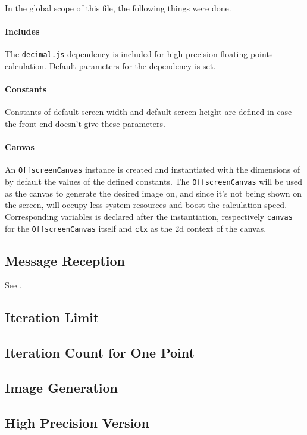 In the global scope of this file, the following things were done.

\paragraph{Includes} The \texttt{decimal.js} dependency is included for high-precision floating points calculation. Default parameters for the dependency is set.

\paragraph{Constants} Constants of default screen width and default screen height are defined in case the front end doesn't give these parameters.

\paragraph{Canvas} An \texttt{OffscreenCanvas} instance is created and instantiated with the dimensions of by default the values of the defined constants. The \texttt{OffscreenCanvas} will be used as the canvas to generate the desired image on, and since it's not being shown on the screen, will occupy less system resources and boost the calculation speed. Corresponding variables is declared after the instantiation, respectively \texttt{canvas} for the \texttt{OffscreenCanvas} itself and \texttt{ctx} as the 2d context of the canvas.

\subsection{Message Reception}

See .

\subsection{Iteration Limit}

\subsection{Iteration Count for One Point}

\subsection{Image Generation}

\subsection{High Precision Version}

